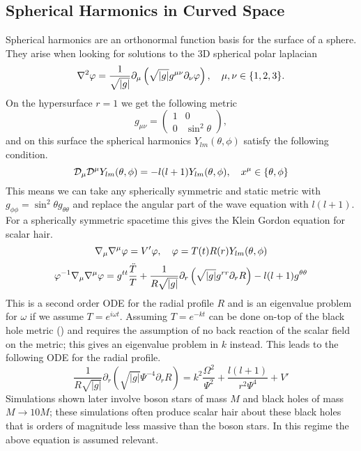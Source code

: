  \subsection{Spherical Harmonics in Curved Space}
 Spherical harmonics are an orthonormal function basis for the surface of a sphere. They arise when looking for solutions to the 3D spherical polar laplacian
 \begin{equation} \nabla^2 \varphi= \frac{1}{\sqrt{|g|}}\partial_{\mu}\left( \sqrt{|g|}g^{\mu\nu}\partial_\nu \varphi\right), \quad \mu,\nu \in \{1,2,3\} .\end{equation}
 On the hypersurface $r=1$ we get the following metric
 \begin{equation} g_{\mu\nu} = \begin{pmatrix} 1 & 0 \\ 0 & \sin^2 \theta\end{pmatrix},\end{equation}
 and on this surface the spherical harmonics $Y_{lm}(\theta,\phi)$ satisfy the following condition.
 \begin{equation} \mathcal{D}_\mu \mathcal{D}^\mu Y_{lm}(\theta,\phi) = -l(l+1)Y_{lm}(\theta,\phi), \quad x^\mu \in \{\theta,\phi\}\end{equation} 
 This means we can take any spherically symmetric and static metric with $g_{\phi\phi} = \sin^2\theta g_{\theta\theta}$ and replace the angular part of the wave equation with $l(l+1)$. For a spherically symmetric spacetime this gives the Klein Gordon equation for scalar hair.
 \begin{equation} \nabla_\mu \nabla^\mu \varphi = V' \varphi, \quad \varphi = T(t)R(r)Y_{lm}(\theta,\phi)\end{equation}
 \begin{equation}\varphi^{-1}\nabla_\mu \nabla^\mu \varphi = g^{tt}\frac{\ddot{T}}{T} +  \frac{1}{R\sqrt{|g|}}\partial_{r}\left( \sqrt{|g|}g^{rr}\partial_r R\right) -{l(l+1)}g^{\theta\theta} \end{equation}
 This is a second order ODE for the radial profile $R$ and is an eigenvalue problem for $\omega$ if we assume $T=e^{i\omega t}$. Assuming $T=e^{-kt}$ can be done on-top of the black hole metric () and requires the assumption of no back reaction of the scalar field on the metric; this gives an eigenvalue problem in $k$ instead. This leads to the following ODE for the radial profile. 
 \begin{equation} \frac{1}{R\sqrt{|g|}}\partial_{r}\left( \sqrt{|g|}\Psi^{-4}\partial_r R\right)  = k^2 \frac{\Omega^2}{\Psi^2} + \frac{l(l+1)}{r^2 \Psi^4} + V'\end{equation}
Simulations shown later involve boson stars of mass $M$ and black holes of mass $M\rightarrow 10M$; these simulations often produce scalar hair about these black holes that is orders of magnitude less massive than the boson stars. In this regime the above equation is assumed relevant.


